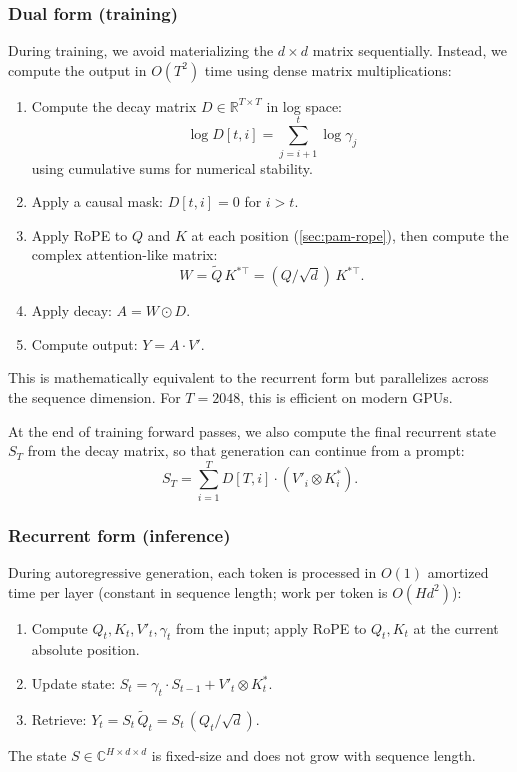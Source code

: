 \documentclass[11pt]{article}
\newcommand{\Complex}{\mathbb{C}}
\begin{document}
\subsubsection{Dual form (training)}
\label{sec:dual-form}
During training, we avoid materializing the $d \times d$ matrix sequentially. Instead, we compute the output in $O(T^2)$ time using dense matrix multiplications:
\begin{enumerate}
  \item Compute the decay matrix $D \in \mathbb{R}^{T \times T}$ in log space:
  \begin{equation}
    \log D[t, i] = \sum_{j=i+1}^{t} \log \gamma_j
  \end{equation}
  using cumulative sums for numerical stability.
  \item Apply a causal mask: $D[t, i] = 0$ for $i > t$.
  \item Apply RoPE to $Q$ and $K$ at each position (\cref{sec:pam-rope}), then compute the complex attention-like matrix:
  \begin{equation}
    W = \tilde{Q} \, K^{*\top} = (Q / \sqrt{d}) \, K^{*\top} .
  \end{equation}
  \item Apply decay: $A = W \odot D$.
  \item Compute output: $Y = A \cdot V'$.
\end{enumerate}
This is mathematically equivalent to the recurrent form but parallelizes across the sequence dimension. For $T = 2048$, this is efficient on modern GPUs.

At the end of training forward passes, we also compute the final recurrent state $S_T$ from the decay matrix, so that generation can continue from a prompt:
\begin{equation}
  S_T = \sum_{i=1}^{T} D[T, i] \cdot (V'_i \otimes K_i^*) .
\end{equation}

\subsubsection{Recurrent form (inference)}
\label{sec:recurrent-form}
During autoregressive generation, each token is processed in $O(1)$ amortized time per layer (constant in sequence length; work per token is $O(Hd^2)$):
\begin{enumerate}
  \item Compute $Q_t, K_t, V'_t, \gamma_t$ from the input; apply RoPE to $Q_t, K_t$ at the current absolute position.
  \item Update state: $S_t = \gamma_t \cdot S_{t-1} + V'_t \otimes K_t^*$.
  \item Retrieve: $Y_t = S_t \, \tilde{Q}_t = S_t \, (Q_t / \sqrt{d})$.
\end{enumerate}
The state $S \in \Complex^{H \times d \times d}$ is fixed-size and does not grow with sequence length.
\end{document}
